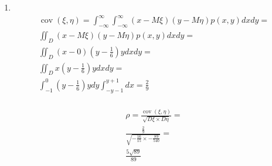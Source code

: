 \documentclass[12pt]{article}
\DeclareMathOperator{\cov}{cov}
\begin{document}
\begin{enumerate}
	\item \mbox{}\\
	      \begin{gather*}
		      \cov(\xi, \eta) = \int_{-\infty}^{\infty}\int_{-\infty}^{\infty}(x - M\xi)(y - M\eta)p(x, y)dxdy = \\
		      \iint_{D}(x - M\xi)(y - M\eta)p(x, y)dxdy = \\
		      \iint_{D}(x - 0)(y - \frac{1}{6})ydxdy = \\
		      \iint_{D}x(y - \frac{1}{6})ydxdy = \\
		      \int_{-1}^{0}(y - \frac{1}{6})ydy\int_{-y-1}^{y+1}dx = \frac{2}{9}\\
	      \end{gather*}

	      \begin{gather*}
		      \rho = \frac{\cov(\xi, \eta)}{\sqrt{D\xi \times D\eta}} = \\
		      \frac{\frac{2}{9}}{\sqrt{-\frac{16}{15} \times -\frac{89}{540}}} = \\
		      \frac{5\sqrt{89}}{89}
	      \end{gather*}

\end{enumerate}
\end{document}
